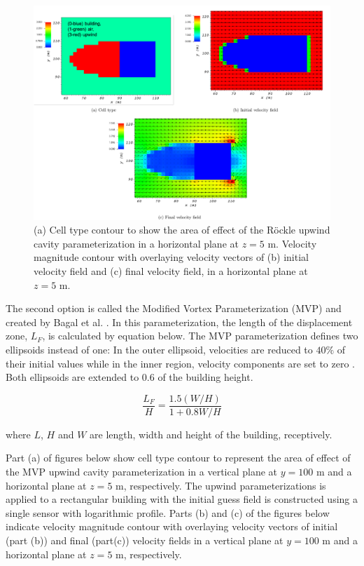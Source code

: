 \begin{figure}[h!]
    \centering
    \includegraphics[width=\textwidth]{Images/upwind_z_5_1.pdf}
    \caption{(a) Cell type contour to show the area of effect of the R\"{o}ckle upwind cavity parameterization in a horizontal plane at $z=5$ m. Velocity magnitude contour with overlaying velocity vectors of (b) initial velocity field and (c) final velocity field, in a horizontal plane at $z=5$ m.}
\end{figure}

The second option is called the Modified Vortex Parameterization (MVP) and created by Bagal et al. \cite{bagal2004improved}. In this parameterization, the length of the displacement zone, $L_F$, is calculated by equation below. The MVP parameterization defines two ellipsoids instead of one: In the outer ellipsoid,  velocities are reduced to $40\%$ of their initial values while in the inner region, velocity components are set to zero \cite{nelson20085}. Both ellipsoids are extended to $0.6$ of the building height.

\begin{equation}
\frac{L_F}{H}=\frac{1.5(W / H)}{1+0.8 W / H}
\label{eq:lf_MVP}
\end{equation}

where $L$, $H$ and $W$ are length, width and height of the building, receptively.

Part (a) of figures below show cell type contour to represent the area of effect of the MVP upwind cavity parameterization in a vertical plane at $y=100$ m and a horizontal plane at $z=5$ m, respectively. The upwind parameterizations is applied to a rectangular building with the initial guess field is constructed using a single sensor with logarithmic profile. Parts (b) and (c) of the figures below indicate velocity magnitude contour with overlaying velocity vectors of initial (part (b)) and final (part(c)) velocity fields in a vertical plane at $y=100$ m and a horizontal plane at $z=5$ m, respectively.

